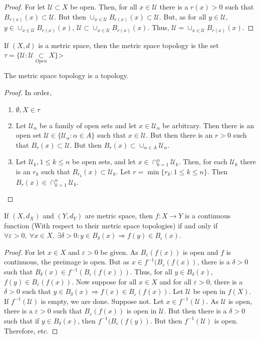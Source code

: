 \documentclass[crop=false,class=book]{standalone}
\begin{document}
\begin{proof}
For let $\mathcal{U} \subset X$ be open. Then, for all $x\in \mathcal{U}$ there is a $r(x)>0$ such that $B_{r(x)}(x) \subset \mathcal{U}$. But then $\cup_{x\in \mathcal{U}}B_{r(x)}(x)\subset \mathcal{U}$. But, as for all $y\in \mathcal{U}$, $y\in \cup_{x\in \mathcal{U}}B_{r(x)}(x)$, $\mathcal{U} \subset \cup_{x\in \mathcal{U}}B_{r(x)}(x)$. Thus, $\mathcal{U}= \cup_{x\in \mathcal{U}}B_{r(x)}(x)$.
\end{proof}
\begin{definition}
If $(X,d)$ is a metric space, then the metric space topology is the set $\tau = \{\mathcal{U}:\mathcal{U}\underset{Open}\subset X\}$>
\end{definition}
\begin{theorem}
The metric space topology is a topology.
\end{theorem}
\begin{proof}
In order,
\begin{enumerate}
\item $\emptyset, X \in \tau$
\item Let $\mathcal{U}_{\alpha}$ be a family of open sets and let $x\in \mathcal{U}_{\alpha}$ be arbitrary. Then there is an open set $\mathcal{U} \in \{\mathcal{U}_{\alpha}:\alpha\in A\}$ such that $x\in \mathcal{U}$. But then there is an $r>0$ such that $B_{r}(x)\subset\mathcal{U}$. But then $B_{r}(x) \subset \cup_{\alpha \in A}\mathcal{U}_{\alpha}$.
\item Let $\mathcal{U}_{k}, 1\leq k \leq n$ be open sets, and let $x\in \cap_{k=1}^{n} \mathcal{U}_k$. Then, for each $\mathcal{U}_k$ there is an $r_{k}$ such that $B_{r_k}(x)\subset \mathcal{U}_{k}$. Let $r = \min\{r_k:1\leq k \leq n\}$. Then $B_{r}(x) \in \cap_{k=1}^{n}\mathcal{U}_k$.
\end{enumerate}
\end{proof}
\begin{theorem}
If $(X,d_X)$ and $(Y,d_Y)$ are metric space, then $f:X\rightarrow Y$ is a continuous function (With respect to their metric space topologies) if and only if $\forall \varepsilon>0,\ \forall x\in X,\ \exists \delta>0:y\in B_{\delta}(x)\Rightarrow f(y) \in B_{\varepsilon}(x)$.
\end{theorem}
\begin{proof}
For let $x\in X$ and $\varepsilon>0$ be given. As $B_{\varepsilon}(f(x))$ is open and $f$ is continuous, the preimage is open. But as $x\in f^{-1}(B_{\varepsilon}(f(x))$, there is a $\delta>0$ such that $B_{\delta}(x)\in f^{-1}(B_{\varepsilon}(f(x)))$. Thus, for all $y \in B_{\delta}(x)$, $f(y) \in B_{\varepsilon}(f(x))$. Now suppose for all $x\in X$ and for all $\varepsilon>0$, there is a $\delta>0$ such that $y\in B_{\delta}(x)\Rightarrow f(x) \in B_{\varepsilon}(f(x))$. Let $\mathcal{U}$ be open in $f(X)$. If $f^{-1}(\mathcal{U})$ is empty, we are done. Suppose not. Let $x\in f^{-1}(\mathcal{U})$. As $\mathcal{U}$ is open, there is a $\varepsilon>0$ such that $B_{\varepsilon}(f(x))$ is open in $\mathcal{U}$. But then there is a $\delta>0$ such that if $y\in B_{\delta}(x)$, then $f^{-1}(B_{\varepsilon}(f(y))$. But then $f^{-1}(\mathcal{U})$ is open. Therefore, etc.
\end{proof}
\end{document}

